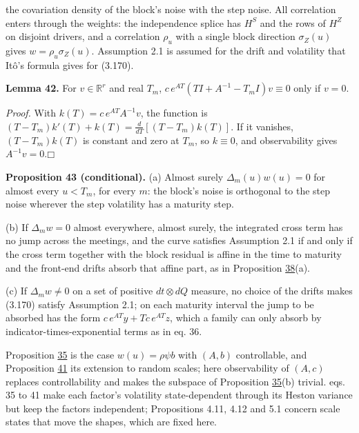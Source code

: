 \documentclass[11pt]{article}
\providecommand{\square}{\mdlgwhtsquare}
\begin{document}
the covariation density of the block's noise with the step noise. All correlation enters through the weights: the independence splice has \(H^S\) and the rows of \(H^Z\) on disjoint drivers, and a correlation \(\rho_u\) with a single block direction \(\sigma_Z(u)\) gives \(w=\rho_u\sigma_Z(u)\). Assumption 2.1 is assumed for the drift and volatility that Itô's formula gives for (3.170).

\label{res:Lemma-42}
\textbf{Lemma 42.} For \(v\in\mathbb R^r\) and real \(T_m\), \(c\,e^{AT}(TI+A^{-1}-T_mI)v\equiv0\) only if \(v=0\).

\emph{Proof.} With \(k(T)=c\,e^{AT}A^{-1}v\), the function is \((T-T_m)k'(T)+k(T)=\frac d{dT}[(T-T_m)k(T)]\). If it vanishes, \((T-T_m)k(T)\) is constant and zero at \(T_m\), so \(k\equiv0\), and observability gives \(A^{-1}v=0\).\hfill$\square$

\label{res:Proposition-43}
\textbf{Proposition 43 (conditional).} (a) Almost surely \(\Delta_m(u)w(u)=0\) for almost every \(u<T_m\), for every \(m\): the block's noise is orthogonal to the step noise wherever the step volatility has a maturity step.

(b) If \(\Delta_mw=0\) almost everywhere, almost surely, the integrated cross term has no jump across the meetings, and the curve satisfies Assumption 2.1 if and only if the cross term together with the block residual is affine in the time to maturity and the front-end drifts absorb that affine part, as in Proposition \hyperref[res:Proposition-38]{38}(a).

(c) If \(\Delta_mw\neq0\) on a set of positive \(dt\otimes dQ\) measure, no choice of the drifts makes (3.170) satisfy Assumption 2.1; on each maturity interval the jump to be absorbed has the form \(c\,e^{AT}y+Tc\,e^{AT}z\), which a family can only absorb by indicator-times-exponential terms as in \cite{brace2024sofr} eq. 36.

Proposition \hyperref[res:Proposition-35]{35} is the case \(w(u)=\rho\psi b\) with \((A,b)\) controllable, and Proposition \hyperref[res:Proposition-41]{41} its extension to random scales; here observability of \((A,c)\) replaces controllability and makes the subspace of Proposition \hyperref[res:Proposition-35]{35}(b) trivial. \cite{brace2024sofr} eqs. 35 to 41 make each factor's volatility state-dependent through its Heston variance but keep the factors independent; \cite{bjork2004finite} Propositions 4.11, 4.12 and 5.1 concern scale states that move the shapes, which are fixed here.
\end{document}
